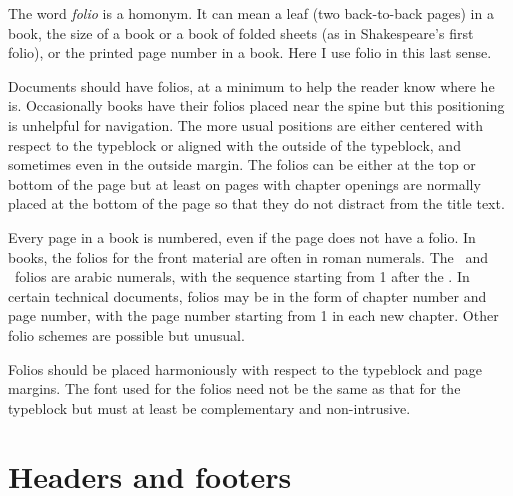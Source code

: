 \documentclass[10pt,a4paper,extrafontsizes]{memoir}
\begin{document}
\begin{paracol}{2}
\switchEng
    The word \emph{folio} is a homonym. It can mean a leaf 
(two back-to-back pages) in a book, the size of a book or a book of
folded sheets (as in Shakespeare's first folio), or the printed page number
in a book. Here I use folio in this last sense.

    Documents should have folios, at a minimum to help the reader know where
he is. Occasionally books have their folios placed near the spine but this
positioning is unhelpful for navigation. The more usual positions are
either centered with respect to the typeblock or aligned 
with the outside of the typeblock, and sometimes even in 
the outside margin. The folios
can be either at the top or bottom of the page but at least on pages 
with chapter openings are normally placed at the bottom of 
the page so that they do not distract from the title text.

    Every page in a book is numbered, even if the page does not have a folio. 
In books, the folios for the front material are often in roman numerals.
The \pixmainmatter\ and \pixbackmatter\ folios are arabic numerals, 
with the sequence
starting from 1 after the \pixfrontmatter. In certain technical documents,
folios may be in the form of chapter number and 
page number, with the page number starting from 1 in each new chapter. 
Other folio schemes are possible but unusual.

    Folios should be placed harmoniously with respect to the 
typeblock and page margins. The font used for 
the folios need not be the same as that for the typeblock 
but must at least be complementary and non-intrusive.
\end{paracol}

\section{Headers and footers}
\end{document}
